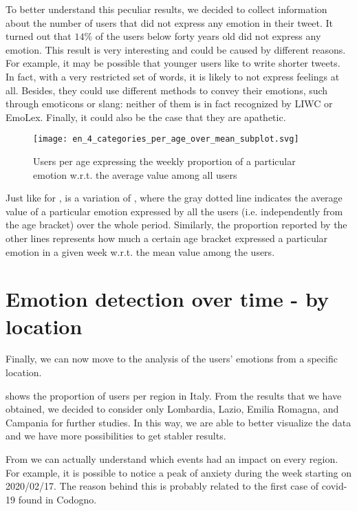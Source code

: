 To better understand this peculiar results, we decided to collect information about the number of users that did not express any emotion in their tweet. It turned out that \(14 \%\) of the users below forty years old did not express any emotion. This result is very interesting and could be caused by different reasons. For example, it may be possible that younger users like to write shorter tweets. In fact, with a very restricted set of words, it is likely to not express feelings at all. Besides, they could use different methods to convey their emotions, such through emoticons or slang: neither of them is in fact recognized by LIWC or EmoLex. Finally, it could also be the case that they are apathetic. 

\begin{figure}[H]
	\centering
    	\texttt{[image: en\_4\_categories\_per\_age\_over\_mean\_subplot.svg]}
    	\caption{Users per age expressing the weekly proportion of a particular emotion w.r.t. the average value among all users}
    	\label{fig:en-4-categories-per-age-over-mean}
\end{figure}

Just like for ,  is a variation of , where the gray dotted line indicates the average value of a particular emotion expressed by all the users (i.e. independently from the age bracket) over the whole period. Similarly, the proportion reported by the other lines represents how much a certain age bracket expressed a particular emotion in a given week w.r.t. the mean value among the users.


\section{Emotion detection over time - by location}
\label{sec:emotion-by-location-results}

Finally, we can now move to the analysis of the users' emotions from a specific location.

 shows the proportion of users per region in Italy. From the results that we have obtained, we decided to consider only Lombardia, Lazio, Emilia Romagna, and Campania for further studies. In this way, we are able to better visualize the data and we have more possibilities to get stabler results.

From  we can actually understand which events had an impact on every region. For example, it is possible to notice a peak of anxiety during the week starting on 2020/02/17. The reason behind this is probably related to the first case of covid-19 found in Codogno.

